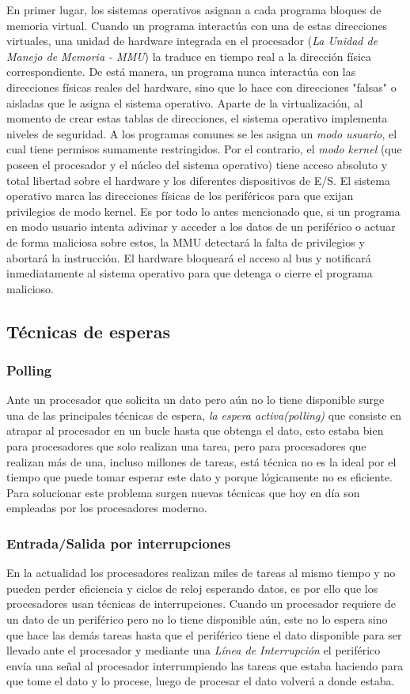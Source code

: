\documentclass[12pt, a4paper]{article}
\begin{document}
En primer lugar, los sistemas operativos asignan a cada programa bloques de memoria virtual. Cuando un programa interactúa con una de estas direcciones virtuales, una unidad de hardware integrada en el procesador (\textit{La Unidad de Manejo de Memoria - MMU}) la traduce en tiempo real a la dirección física correspondiente. De está manera, un programa nunca interactúa con las direcciones físicas reales del hardware, sino que lo hace con direcciones "falsas" o aisladas que le asigna el sistema operativo. Aparte de la virtualización, al momento de crear estas tablas de direcciones, el sistema operativo implementa niveles de seguridad. A los programas comunes se les asigna un \textit{modo usuario}, el cual tiene permisos sumamente restringidos. Por el contrario, el \textit{modo kernel} (que poseen el procesador y el núcleo del sistema operativo) tiene acceso absoluto y total libertad sobre el hardware y los diferentes dispositivos de E/S. El sistema operativo marca las direcciones físicas de los periféricos para que exijan privilegios de modo kernel. Es por todo lo antes mencionado que, si un programa en modo usuario intenta adivinar y acceder a los datos de un periférico o actuar de forma maliciosa sobre estos, la MMU detectará la falta de privilegios y abortará la instrucción. El hardware bloqueará el acceso al bus y notificará inmediatamente al sistema operativo para que detenga o cierre el programa malicioso.

\subsection{Técnicas de esperas}
\subsubsection{Polling}
Ante un procesador que solicita un dato pero aún no lo tiene disponible surge una de las principales técnicas de espera, \textit{la espera activa(polling)} que consiste en atrapar al procesador en un bucle hasta que obtenga el dato, esto estaba bien para procesadores que solo realizan una tarea, pero para procesadores que realizan más de una, incluso millones de tareas, está técnica no es la ideal por el tiempo que puede tomar esperar este dato y porque lógicamente no es eficiente. Para solucionar este problema surgen nuevas técnicas que hoy en día son empleadas por los procesadores moderno.
\subsubsection{Entrada/Salida por interrupciones}
En la actualidad los procesadores realizan miles de tareas al mismo tiempo y no pueden perder eficiencia y ciclos de reloj esperando datos, es por ello que los procesadores usan técnicas de interrupciones. Cuando un procesador requiere de un dato de un periférico pero no lo tiene disponible aún, este no lo espera sino que hace las demás tareas hasta que el periférico tiene el dato disponible para ser llevado ante el procesador y mediante una \textit{Línea de Interrupción} el periférico envía una señal al procesador interrumpiendo las tareas que estaba haciendo para que tome el dato y lo procese, luego de procesar el dato volverá a donde estaba.
\end{document}
